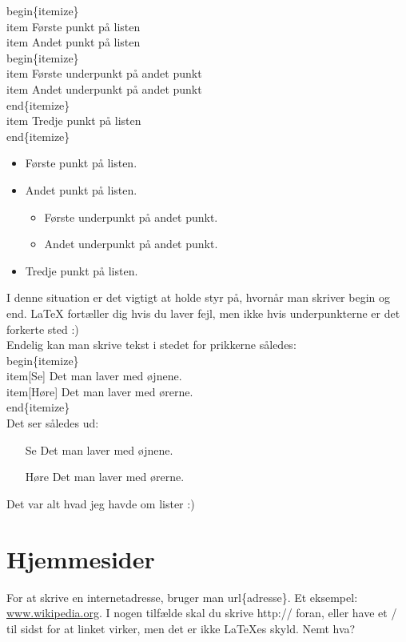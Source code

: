 \indent \bs begin\{itemize\}\\
\indent \bs item Første punkt på listen\\
\indent \bs item Andet punkt på listen\\
\indent \bs begin\{itemize\}\\
\indent \bs item Første underpunkt på andet punkt\\
\indent \bs item Andet underpunkt på andet punkt\\
\indent \bs end\{itemize\}\\
\indent \bs item Tredje punkt på listen\\
\indent \bs end\{itemize\}\\

\begin{itemize}
\item Første punkt på listen.
\item Andet punkt på listen.
\begin{itemize}
\item Første underpunkt på andet punkt.
\item Andet underpunkt på andet punkt.
\end{itemize}
\item Tredje punkt på listen.
\end{itemize}

\noindent
I denne situation er det vigtigt at holde styr på, hvornår man skriver \bs begin og \bs end. LaTeX fortæller dig hvis du laver fejl, men ikke hvis underpunkterne er det forkerte sted :)\\

\noindent
Endelig kan man skrive tekst i stedet for prikkerne således:\\

\indent \bs begin\{itemize\}\\
\indent \bs item[Se] Det man laver med øjnene.\\
\indent \bs item[Høre] Det man laver med ørerne.\\
\indent \bs end\{itemize\}\\

\noindent
Det ser således ud:

\begin{itemize}
\item[Se] Det man laver med øjnene.
\item[Høre] Det man laver med ørerne.
\end{itemize}

\noindent
Det var alt hvad jeg havde om lister :)

\section{Hjemmesider}
For at skrive en internetadresse, bruger man \bs url\{adresse\}. Et eksempel: \url{www.wikipedia.org}. I nogen tilfælde skal du skrive http:// foran, eller have et / til sidst for at linket virker, men det er ikke LaTeXes skyld. Nemt hva?